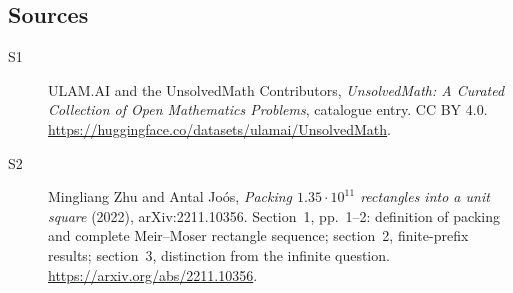 \documentclass[11pt]{book}
\begin{document}
\subsection{Sources}
\begin{description}
\item[\hypertarget{source:statement:1}{S1}] ULAM.AI and the UnsolvedMath Contributors, \emph{UnsolvedMath: A Curated Collection of Open Mathematics Problems}, catalogue entry. CC BY 4.0. \url{https://huggingface.co/datasets/ulamai/UnsolvedMath}.
\item[\hypertarget{source:statement:2}{S2}] Mingliang Zhu and Antal Jo\'os, \emph{Packing $1.35\cdot10^{11}$ rectangles into a unit square} (2022), arXiv:2211.10356. Section~1, pp.~1--2: definition of packing and complete Meir--Moser rectangle sequence; section~2, finite-prefix results; section~3, distinction from the infinite question. \url{https://arxiv.org/abs/2211.10356}.
\end{description}
\label{end:statement}
\end{document}
